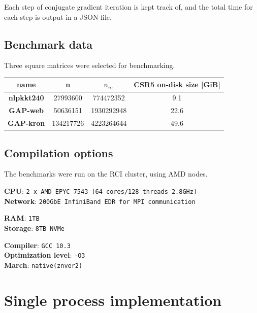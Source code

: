 \documentclass[thesis=M,english]{FITthesis}[2019/12/23]
\begin{document}
Each step of conjugate gradient iteration is kept track of, and the total time
for each step is output in a JSON file.

\subsection{Benchmark data}

Three square matrices were selected for benchmarking.

\begin{tabular}{|c|c|c|c|}
    \hline
    \textbf{name}      & \textbf{n} & $n_{nz}$   & \textbf{CSR5 on-disk size} [GiB] \\
    \hline
    \hline
    \textbf{nlpkkt240} & 27993600   & 774472352  & 9.1                              \\
    \hline
    \textbf{GAP-web}   & 50636151   & 1930292948 & 22.6                             \\
    \hline
    \textbf{GAP-kron}  & 134217726  & 4223264644 & 49.6                             \\
    \hline
\end{tabular}


\subsection{Compilation options}

The benchmarks were run on the RCI cluster, using AMD nodes.

\textbf{CPU}: \texttt{2 x AMD EPYC 7543 (64 cores/128 threads 2.8GHz)} \\
\textbf{Network}: \texttt{200GbE InfiniBand EDR for MPI communication}\\
\begin{minipage}{0.5\textwidth}
    \textbf{RAM}: \texttt{1TB}\\
    \textbf{Storage}: \texttt{8TB NVMe} \\
\end{minipage}%
\begin{minipage}{0.5\textwidth}
    \textbf{Compiler}: \texttt{GCC 10.3} \\
    \textbf{Optimization level}: \texttt{-O3} \\
    \textbf{March}: \texttt{native(znver2)} \\
\end{minipage}



\section{Single process implementation}
\end{document}
